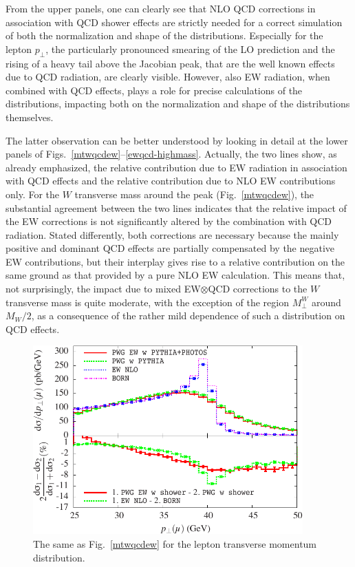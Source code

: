 \documentclass[11pt,a4paper]{article}
\begin{document}
From the upper panels, one can clearly see that NLO QCD corrections in association with QCD shower effects are strictly needed for a correct simulation of both the
normalization and shape of the distributions. Especially for the lepton $p_\perp$, the particularly pronounced smearing of the LO prediction and the rising 
of a heavy tail above the Jacobian peak, that are the well known effects due to QCD 
radiation, are clearly visible. However, also EW radiation, when combined with QCD effects, plays a role for precise calculations of the distributions, impacting both on the normalization and shape of the distributions themselves.


The latter observation can be better understood by looking 
in detail at the lower panels of  Figs.~\ref{mtwqcdew}--\ref{ewqcd-highmass}. 
Actually, the two lines show, as already emphasized, 
the relative contribution due to EW radiation in association with QCD effects and the relative contribution due to NLO EW contributions only. For the $W$ transverse mass around the peak (Fig.~\ref{mtwqcdew}), the substantial agreement between the two lines indicates that the relative impact of the EW 
corrections is not significantly altered by the combination with QCD radiation. 
Stated differently, both corrections are necessary because the mainly positive and dominant QCD effects are partially compensated by the negative EW contributions, 
but their interplay gives rise to a relative contribution on the same ground as that provided by a pure NLO EW calculation. This means that, not surprisingly, 
the impact due to mixed EW$\otimes$QCD corrections to the $W$ transverse mass is quite moderate, 
with the exception of the region $M_\perp^W$ around $M_W/2$, as a consequence of the 
rather mild dependence of such a 
distribution on QCD effects.

\begin{figure}[hbtp]
\begin{center}
\includegraphics[height=7.25cm]{Fig4}
\caption{The same as Fig.~\ref{mtwqcdew} for the lepton transverse momentum distribution.}
\label{ptlqcdew}
\end{center}
\end{figure}
\end{document}
